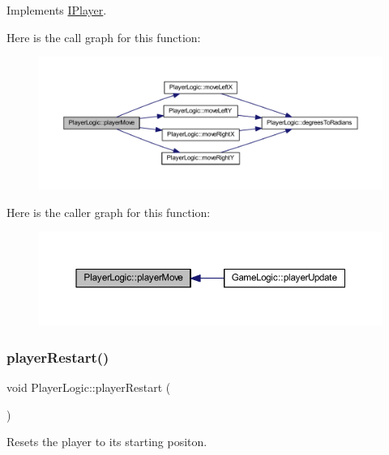Implements \hyperlink{class_i_player_a39685438043898f69bcf62c81b60e7b9}{I\+Player}.

Here is the call graph for this function\+:\nopagebreak
\begin{figure}[H]
\begin{center}
\leavevmode
\includegraphics[width=350pt]{class_player_logic_a2b63d2c01e898e5798c2801466c8b432_cgraph}
\end{center}
\end{figure}
Here is the caller graph for this function\+:
\nopagebreak
\begin{figure}[H]
\begin{center}
\leavevmode
\includegraphics[width=350pt]{class_player_logic_a2b63d2c01e898e5798c2801466c8b432_icgraph}
\end{center}
\end{figure}
\mbox{\label{class_player_logic_aaaf0e8356e5af9753015960be7727724}} 
\subsubsection{\texorpdfstring{player\+Restart()}{playerRestart()}}
{\footnotesize\ttfamily void Player\+Logic\+::player\+Restart (\begin{DoxyParamCaption}{ }\end{DoxyParamCaption})}



Resets the player to its starting positon. 

